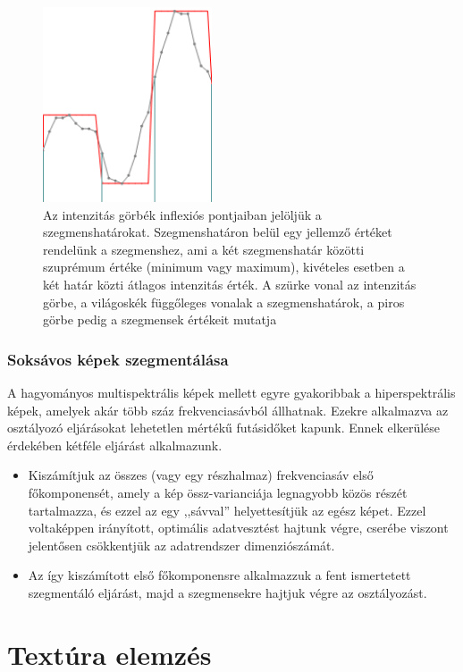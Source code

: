 \documentclass[a4paper,12pt]{article}
\begin{document}
\begin{figure}
	 \centering
	 \includegraphics[width=5cm]{seg1.png}
	 \caption{Az intenzitás görbék inflexiós pontjaiban jelöljük a szegmenshatárokat. Szegmenshatáron belül egy jellemző értéket rendelünk a szegmenshez, ami a két szegmenshatár közötti szuprémum értéke (minimum vagy maximum), kivételes esetben a két határ közti átlagos intenzitás érték. A szürke vonal az intenzitás görbe, a világoskék függőleges vonalak a szegmenshatárok, a piros görbe pedig a szegmensek értékeit mutatja}
	 \label{fig:seg1}
\end{figure}
 
\subsubsection{Soksávos képek szegmentálása}

A hagyományos multispektrális képek mellett egyre gyakoribbak a hiperspektrális képek, amelyek akár több száz frekvenciasávból állhatnak. Ezekre alkalmazva az osztályozó eljárásokat lehetetlen mértékű futásidőket kapunk. Ennek elkerülése érdekében kétféle eljárást alkalmazunk.

\begin{itemize}
	\item Kiszámítjuk az összes (vagy egy részhalmaz) frekvenciasáv első főkomponensét, amely a kép össz-varianciája legnagyobb közös részét tartalmazza, és ezzel az egy ,,sávval'' helyettesítjük az egész képet. Ezzel voltaképpen irányított, optimális adatvesztést hajtunk végre, cserébe viszont jelentősen csökkentjük az adatrendszer dimenziószámát.	
	
	\item Az így kiszámított első főkomponensre alkalmazzuk a fent ismertetett szegmentáló eljárást, majd a szegmensekre hajtjuk végre az osztályozást.
\end{itemize}


\section{Textúra elemzés}
\end{document}
